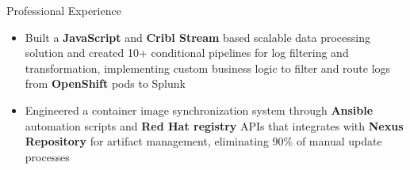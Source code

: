\documentclass{resume}
\begin{document}
    \begin{experienceSection}{Professional Experience}


    \experienceItem[
        company={Arch Mortgage Insurance},
        location={Greensboro, NC},
        position={Software Engineer Intern},
        duration={Jun 2024 - Aug 2024}
    ]
    \begin{itemize}
        \itemsep -6pt {}
        \item Built a \textbf{JavaScript} and \textbf{Cribl Stream} based scalable data processing solution and created 10+ conditional pipelines for log filtering and transformation, implementing custom business logic to filter and route logs from \textbf{OpenShift} pods to Splunk
        \item Engineered a container image synchronization system through \textbf{Ansible} automation scripts and \textbf{Red Hat registry} APIs that integrates with \textbf{Nexus Repository} for artifact management, eliminating 90\% of manual update processes
        
    \end{itemize}


\end{experienceSection}
\end{document}
